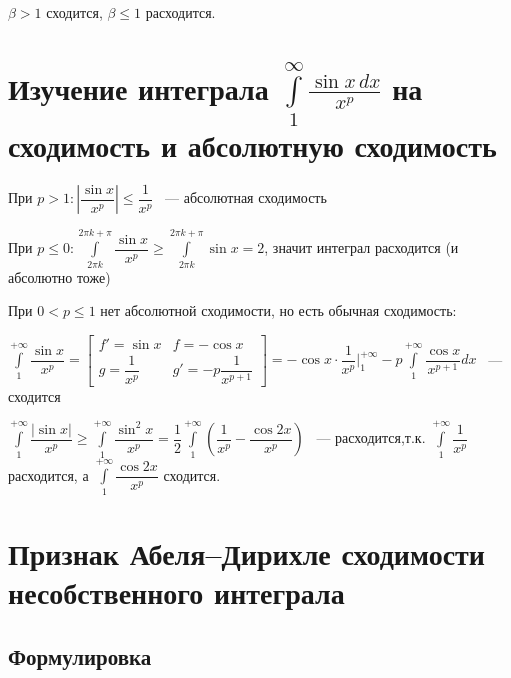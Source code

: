 \documentclass{article}
\begin{document}
            $\beta > 1$ сходится, $\beta \leq 1$ расходится.
        
    \newpage
    
    \section{Изучение интеграла $\int\limits_1^{\infty} \frac{\sin x\,dx}{x^p}$ на сходимость и абсолютную сходимость}
    
        При $p > 1 : \left| \dfrac{\sin{x}}{x^p} \right| \leq \dfrac{1}{x^p}$ ~--- абсолютная сходимость
        
        При $p \leq 0 : \int\limits^{2 \pi k + \pi}_{2 \pi k} \dfrac{\sin{x}}{x^p} \geq \int\limits^{2 \pi k + \pi}_{2 \pi k} \sin{x} = 2$, значит интеграл расходится (и абсолютно тоже)
        
        При $0 < p \leq 1$ нет абсолютной сходимости, но есть обычная сходимость:
        
        $\int\limits^{+\infty}_1 \dfrac{\sin{x}}{x^p} = \begin{bmatrix} f' = \sin x & f = -\cos x \\ g = \dfrac{1}{x^p} & g' = -p \dfrac{1}{x^{p + 1}} \end{bmatrix} = - \cos{x} \cdot \dfrac{1}{x^p} \bigg|^{+\infty}_1 - p \int\limits^{+\infty}_1 \dfrac{\cos{x}}{x^{p + 1}} dx$ ~--- сходится
        
        $\int\limits^{+\infty}_1 \dfrac{|\sin{x}|}{x^p} \geq \int\limits^{+\infty}_1 \dfrac{\sin^2 x}{x^p} = \dfrac{1}{2} \int\limits^{+\infty}_1 \left( \dfrac{1}{x^p} - \dfrac{\cos{2x}}{x^p} \right)$ ~--- расходится,т.к. $\int\limits^{+\infty}_1 \dfrac{1}{x^p}$ расходится, а $\int\limits^{+\infty}_1 \dfrac{\cos{2x}}{x^p}$ сходится.
        
        
    \newpage
    
    \section{Признак Абеля--Дирихле сходимости несобственного интеграла}
    
        \subsection{Формулировка}
        
\end{document}
